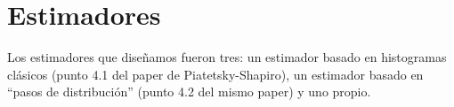 \section{Estimadores}

Los estimadores que diseñamos fueron tres: un estimador basado en histogramas clásicos (punto 4.1 del paper de Piatetsky-Shapiro), un estimador basado en ``pasos de distribución'' (punto 4.2 del mismo paper) y uno propio.

